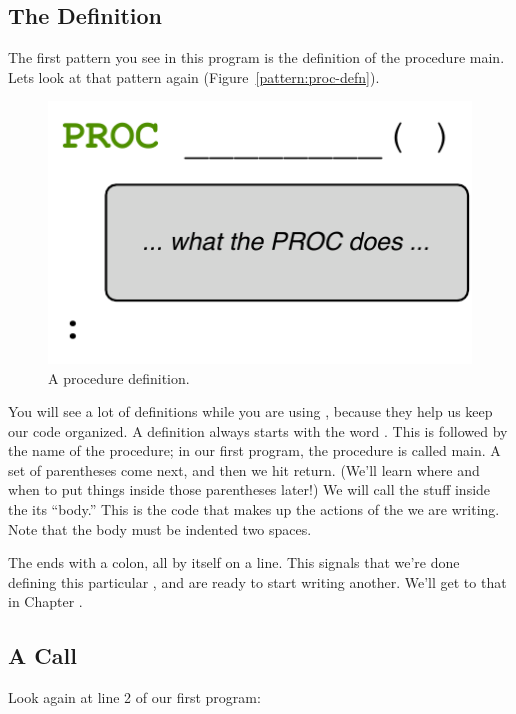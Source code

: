 \subsection{The \PROCedure Definition}
The first pattern you see in this program is the definition of the procedure {\code main}. Lets look at that pattern again (Figure~\vref{pattern:proc-defn}).

\begin{figure}[h]
  \begin{center}
    \includegraphics[scale=1.0]{images/ch1-proc-defn-pattern}
    \caption{A procedure definition.}
    \label{pattern:ch1-proc-defn}
  \end{center}
\end{figure}

You will see a lot of \PROCedure definitions while you are using \plumbing, because they help us keep our code organized. A \PROCedure definition always starts with the word \PROC. This is followed by the name of the procedure; in our first program, the procedure is called {\code main}. A set of parentheses come next, and then we hit return. (We'll learn where and when to put things inside those parentheses later!) We will call the stuff inside the \PROCedure its ``body.'' This is the code that makes up the actions of the \PROC we are writing. Note that the body must be indented two spaces. 

The \PROC ends with a colon, all by itself on a line. This signals that we're done defining this particular \PROC, and are ready to start writing another. We'll get to that in Chapter \XXX.

\subsection{A \PROCedure Call}
Look again at line 2 of our first program:

